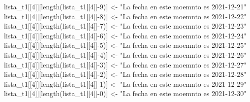 \documentclass[
]{article}
\newenvironment{Shaded}{\begin{snugshade}}{\end{snugshade}}
\newcommand{\DecValTok}[1]{\textcolor[rgb]{0.00,0.00,0.81}{#1}}
\newcommand{\FunctionTok}[1]{\textcolor[rgb]{0.00,0.00,0.00}{#1}}
\newcommand{\NormalTok}[1]{#1}
\newcommand{\OtherTok}[1]{\textcolor[rgb]{0.56,0.35,0.01}{#1}}
\newcommand{\SpecialCharTok}[1]{\textcolor[rgb]{0.00,0.00,0.00}{#1}}
\newcommand{\StringTok}[1]{\textcolor[rgb]{0.31,0.60,0.02}{#1}}
\begin{document}
\begin{Shaded}
\begin{Highlighting}[]
\NormalTok{lista\_t1[[}\DecValTok{4}\NormalTok{]][}\FunctionTok{length}\NormalTok{(lista\_t1[[}\DecValTok{4}\NormalTok{]]}\SpecialCharTok{{-}}\DecValTok{9}\NormalTok{)] }\OtherTok{\textless{}{-}} \StringTok{"La fecha en este moemnto es 2021{-}12{-}21"}
\NormalTok{lista\_t1[[}\DecValTok{4}\NormalTok{]][}\FunctionTok{length}\NormalTok{(lista\_t1[[}\DecValTok{4}\NormalTok{]]}\SpecialCharTok{{-}}\DecValTok{8}\NormalTok{)] }\OtherTok{\textless{}{-}} \StringTok{"La fecha en este moemnto es 2021{-}12{-}22"}
\NormalTok{lista\_t1[[}\DecValTok{4}\NormalTok{]][}\FunctionTok{length}\NormalTok{(lista\_t1[[}\DecValTok{4}\NormalTok{]]}\SpecialCharTok{{-}}\DecValTok{7}\NormalTok{)] }\OtherTok{\textless{}{-}} \StringTok{"La fecha en este moemnto es 2021{-}12{-}23"}
\NormalTok{lista\_t1[[}\DecValTok{4}\NormalTok{]][}\FunctionTok{length}\NormalTok{(lista\_t1[[}\DecValTok{4}\NormalTok{]]}\SpecialCharTok{{-}}\DecValTok{6}\NormalTok{)] }\OtherTok{\textless{}{-}} \StringTok{"La fecha en este moemnto es 2021{-}12{-}24"}
\NormalTok{lista\_t1[[}\DecValTok{4}\NormalTok{]][}\FunctionTok{length}\NormalTok{(lista\_t1[[}\DecValTok{4}\NormalTok{]]}\SpecialCharTok{{-}}\DecValTok{5}\NormalTok{)] }\OtherTok{\textless{}{-}} \StringTok{"La fecha en este moemnto es 2021{-}12{-}25"}
\NormalTok{lista\_t1[[}\DecValTok{4}\NormalTok{]][}\FunctionTok{length}\NormalTok{(lista\_t1[[}\DecValTok{4}\NormalTok{]]}\SpecialCharTok{{-}}\DecValTok{4}\NormalTok{)] }\OtherTok{\textless{}{-}} \StringTok{"La fecha en este moemnto es 2021{-}12{-}26"}
\NormalTok{lista\_t1[[}\DecValTok{4}\NormalTok{]][}\FunctionTok{length}\NormalTok{(lista\_t1[[}\DecValTok{4}\NormalTok{]]}\SpecialCharTok{{-}}\DecValTok{3}\NormalTok{)] }\OtherTok{\textless{}{-}} \StringTok{"La fecha en este moemnto es 2021{-}12{-}27"}
\NormalTok{lista\_t1[[}\DecValTok{4}\NormalTok{]][}\FunctionTok{length}\NormalTok{(lista\_t1[[}\DecValTok{4}\NormalTok{]]}\SpecialCharTok{{-}}\DecValTok{2}\NormalTok{)] }\OtherTok{\textless{}{-}} \StringTok{"La fecha en este moemnto es 2021{-}12{-}28"}
\NormalTok{lista\_t1[[}\DecValTok{4}\NormalTok{]][}\FunctionTok{length}\NormalTok{(lista\_t1[[}\DecValTok{4}\NormalTok{]]}\SpecialCharTok{{-}}\DecValTok{1}\NormalTok{)] }\OtherTok{\textless{}{-}} \StringTok{"La fecha en este moemnto es 2021{-}12{-}29"}
\NormalTok{lista\_t1[[}\DecValTok{4}\NormalTok{]][}\FunctionTok{length}\NormalTok{(lista\_t1[[}\DecValTok{4}\NormalTok{]]}\SpecialCharTok{{-}}\DecValTok{0}\NormalTok{)] }\OtherTok{\textless{}{-}} \StringTok{"La fecha en este moemnto es 2021{-}12{-}30"}
\end{Highlighting}
\end{Shaded}
\end{document}
